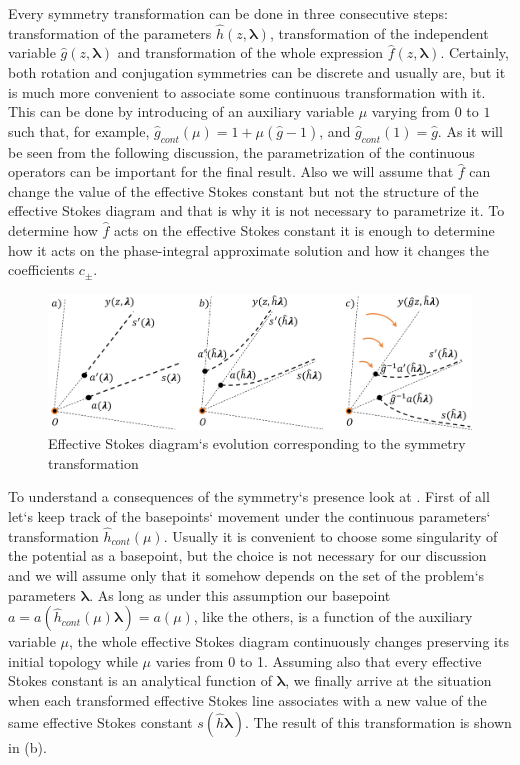 \documentclass[12pt]{iopart}
\def\f{\hat{f}}
\def\g{\hat{g}}
\def\h{\hat{h}}
\def\lmbd{\bm{\lambda}}
\def\unity{1}
\begin{document}
Every symmetry transformation can be done in three consecutive steps: transformation 
of the parameters $\h(z,\lmbd)$, transformation of the independent variable $\g(z,\lmbd)$ and 
transformation of the whole expression $\f(z,\lmbd)$. 
Certainly, both rotation and conjugation symmetries can be discrete and 
usually are, but it is much more convenient to associate some continuous transformation 
with it. This can be done by introducing of an auxiliary variable $\mu$ varying from $0$ 
to $1$ such that, for example, $\g_{cont}(\mu)=\unity+\mu (\g-\unity)$, and $\g_{cont}(1)=\g$. 
As it will be seen from the following discussion, the parametrization of the 
continuous operators can be important for the final result. Also we will assume that $\f$ can 
change the value of the effective Stokes constant but not the structure of the effective Stokes diagram and 
that is why it is not necessary to parametrize it. To determine how $\f$ acts on the 
effective Stokes constant it is enough to determine how it acts on the phase-integral approximate 
solution  and how it changes the coefficients $c_\pm$.

\begin{figure}
\centering
\noindent
\includegraphics[width=\textwidth]{stuff/rs.png}
\caption{Effective Stokes diagram`s evolution corresponding to the symmetry transformation}
\label{fig:rst}
\end{figure}

To understand a consequences of the symmetry`s presence look at . 
First of all let`s keep track of the basepoints` movement under the continuous parameters` 
transformation $\h_{cont}(\mu)$. Usually it is convenient to choose some singularity of the 
potential as a basepoint, but the choice is not necessary for our discussion and we will assume 
only that it somehow depends on the set of the problem`s parameters $\lmbd$. As long as under 
this assumption our basepoint $a=a(\h_{cont}(\mu)\lmbd)=a(\mu)$, like the others, is a function 
of the auxiliary variable $\mu$, the whole effective Stokes diagram continuously changes preserving its 
initial topology while $\mu$ varies from 0 to 1. Assuming also that every effective Stokes constant is 
an analytical function of $\lmbd$, we finally arrive at the situation when each transformed effective Stokes 
line associates with a new value of the same effective Stokes constant $s(\h\lmbd)$. The result of this 
transformation is shown in (b). 
\end{document}
